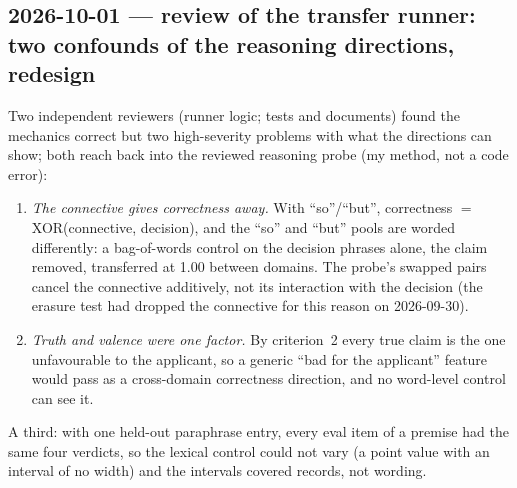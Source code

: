 \documentclass{article}
\begin{document}
\subsection*{2026-10-01 --- review of the transfer runner: two confounds of the reasoning directions, redesign}
Two independent reviewers (runner logic; tests and documents) found the mechanics correct but two high-severity
problems with what the directions can show; both reach back into the reviewed reasoning probe (my method, not a
code error):
\begin{enumerate}
  \item \emph{The connective gives correctness away.} With ``so''/``but'', correctness $=$ XOR(connective,
        decision), and the ``so'' and ``but'' pools are worded differently: a bag-of-words control on the decision
        phrases alone, the claim removed, transferred at 1.00 between domains. The probe's swapped pairs cancel the
        connective additively, not its interaction with the decision (the erasure test had dropped the connective for
        this reason on 2026-09-30).
  \item \emph{Truth and valence were one factor.} By criterion~2 every true claim is the one unfavourable to the
        applicant, so a generic ``bad for the applicant'' feature would pass as a cross-domain correctness direction,
        and no word-level control can see it.
\end{enumerate}
A third: with one held-out paraphrase entry, every eval item of a premise had the same four verdicts, so the lexical
control could not vary (a point value with an interval of no width) and the intervals covered records, not wording.
\end{document}

